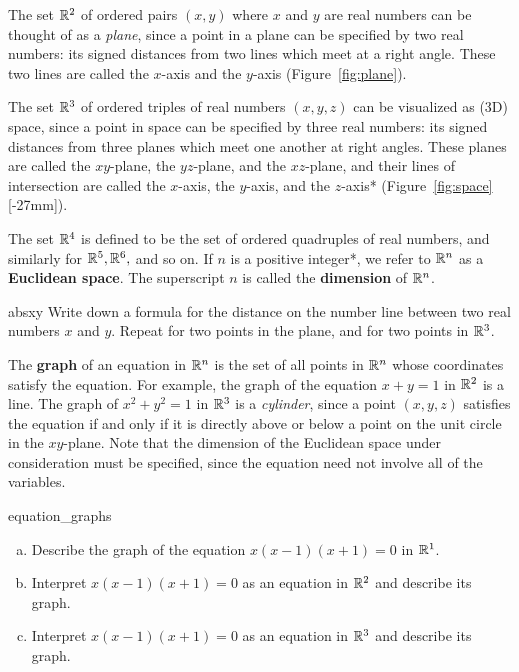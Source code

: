\documentclass{watsonbook}
\begin{document}
The set $\mathbb{R}^2$ of ordered pairs $(x,y)$ where $x$ and $y$ are real
numbers can be thought of as a \textit{plane}, since a point in a
plane can be specified by two real numbers: its signed distances from
two lines which meet at a right angle. These two lines are called the
$x$-axis and the $y$-axis (Figure~\ref{fig:plane}). 

The set $\mathbb{R}^3$ of ordered triples of real numbers $(x,y,z)$ can be
visualized as (3D) space, since a point in space can be specified by
three real numbers: its signed distances from three planes which meet
one another at right angles. These planes are called the $xy$-plane,
the $yz$-plane, and the $xz$-plane, and their lines of intersection
are called the $x$-axis, the $y$-axis, and the $z$-axis*
(Figure~\ref{fig:space}[-27mm]).

The set $\mathbb{R}^4$ is defined to be the set of ordered quadruples of real
numbers, and similarly for $\mathbb{R}^5, \mathbb{R}^6,$ and so on.  
 If
$n$ is a positive integer*, we refer to $\mathbb{R}^n$ as a \textbf{Euclidean
  space}. The superscript $n$
is called the \textbf{dimension} of $\mathbb{R}^n$.

\begin{exercise}[parbox=true]{}{absxy}
  Write down a formula for the distance on the number line between two 
  real numbers $x$ and $y$. Repeat for two points in the plane, and
  for two points in $\mathbb{R}^3$. 
\end{exercise}

\bang{4mm}
The \textbf{graph} of an equation in $\mathbb{R}^n$ is the set of all points
in $\mathbb{R}^n$ whose coordinates satisfy the equation. For example, the
graph of the equation $x + y = 1$ in $\mathbb{R}^2$ is a line. The graph of
$x^2 + y^2 = 1$ in $\mathbb{R}^3$ is a \textit{cylinder}, since a point
$(x,y,z)$ satisfies the equation if and only if it is directly above
or below a point on the unit circle in the $xy$-plane. Note that the
dimension of the Euclidean space under consideration must be
specified, since the equation need not involve all of the variables.

\begin{exercise}{}{equation_graphs}
  \begin{enumerate}[(a), leftmargin = 12pt, itemsep = 4pt]
  \item Describe the graph of the equation $x(x-1)(x+1) = 0$ in
    $\mathbb{R}^1$. 
  \item Interpret $x(x-1)(x+1) = 0$ as an equation in $\mathbb{R}^2$ and
    describe its graph. 
  \item Interpret $x(x-1)(x+1) = 0$ as an equation in $\mathbb{R}^3$ and
    describe its graph.
  \end{enumerate}
\end{exercise}
\end{document}
